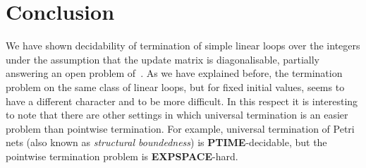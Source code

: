 \chapter{Conclusion}






We have shown decidability of termination of simple linear loops over
the integers under the assumption that the update matrix is
diagonalisable, partially answering an open problem
of~\cite{Tiw04,Bra06}.  As we have explained before, the termination
problem on the same class of linear loops, but for fixed initial
values, seems to have a different character and to be more difficult.
In this respect it is interesting to note that there are other
settings in which universal termination is an easier problem than
pointwise termination. For example, universal termination of Petri
nets (also known as \textit{structural boundedness}) is
\textbf{PTIME}-decidable, but the pointwise termination problem is
\textbf{EXPSPACE}-hard.

